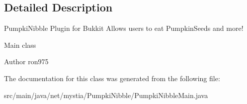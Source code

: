 \subsection{Detailed Description}
Pumpki\-Nibble Plugin for Bukkit Allows users to eat Pumpkin\-Seeds and more!

Main class \begin{DoxyAuthor}{Author}
ron975 
\end{DoxyAuthor}


The documentation for this class was generated from the following file\-:\begin{DoxyCompactItemize}
\item 
src/main/java/net/mystia/\-Pumpki\-Nibble/Pumpki\-Nibble\-Main.\-java\end{DoxyCompactItemize}
